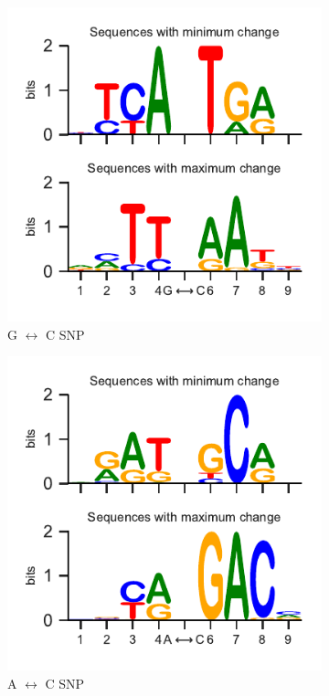 \begin{figure}[p]
  \begin{subfigure}{7cm}
    \centering\includegraphics{images/SNIPS_seq_logo_CG.pdf}
    \centering\caption{G $\longleftrightarrow$ C SNP}
    \end{subfigure}
  \begin{subfigure}{7cm}
    \centering\includegraphics{images/SNIPS_seq_logo_AC.pdf}
    \centering\caption{A $\longleftrightarrow$ C SNP}
    \end{subfigure}
  \begin{subfigure}{7cm}

\end{subfigure}
\end{figure}
